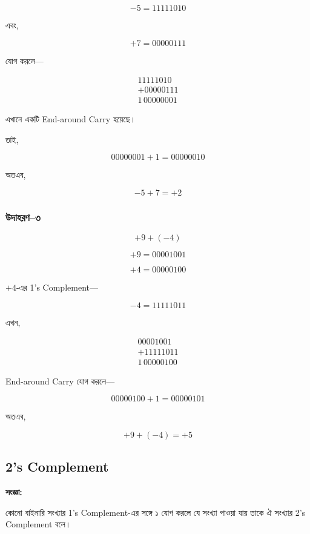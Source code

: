 \[
-5=11111010
\]

এবং,

\[
+7=00000111
\]

যোগ করলে—

\[
\begin{array}{r}
11111010\\
+00000111\\
\hline
1\,00000001
\end{array}
\]

এখানে একটি \textenglish{End-around Carry} হয়েছে।

তাই,

\[
00000001+1=00000010
\]

অতএব,

\[
\boxed{-5+7=+2}
\]

\subsubsection*{উদাহরণ--৩}

\[
+9+(-4)
\]

\[
+9=00001001
\]

\[
+4=00000100
\]

$+4$-এর \textenglish{1's Complement}—

\[
-4=11111011
\]

এখন,

\[
\begin{array}{r}
00001001\\
+11111011\\
\hline
1\,00000100
\end{array}
\]

\textenglish{End-around Carry} যোগ করলে—

\[
00000100+1=00000101
\]

অতএব,

\[
\boxed{+9+(-4)=+5}
\]


\subsection{\textenglish{2's Complement}}

\par\begingroup

\textbf{সংজ্ঞা:}

কোনো বাইনারি সংখ্যার
\textenglish{1's Complement}-এর সঙ্গে ১ যোগ করলে
যে সংখ্যা পাওয়া যায় তাকে ঐ সংখ্যার
\textenglish{2's Complement} বলে।
\par\endgroup


